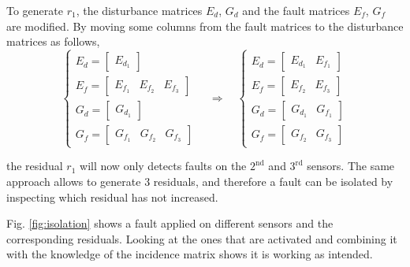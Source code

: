 \documentclass[conference]{IEEEtran}
\begin{document}
To generate $r_1$, the disturbance matrices $E_d$, $G_d$ and the fault matrices $E_f$, $G_f$ are modified. By moving some columns from the fault matrices to the disturbance matrices as follows,
\begin{equation}
    \begin{cases}
        E_d = \begin{bmatrix}
            E_{d_1}
        \end{bmatrix} \\
        E_f = \begin{bmatrix}
            E_{f_1} & E_{f_2} & E_{f_3}
        \end{bmatrix} \\
        G_d = \begin{bmatrix}
            G_{d_1}
        \end{bmatrix} \\
        G_f = \begin{bmatrix}
            G_{f_1} & G_{f_2} & G_{f_3}
        \end{bmatrix}
    \end{cases}
    \quad \Rightarrow \quad \begin{cases}
        E_d = \begin{bmatrix}
            E_{d_1} & E_{f_1}
        \end{bmatrix} \\
        E_f = \begin{bmatrix}
            E_{f_2} & E_{f_3}
        \end{bmatrix} \\
        G_d = \begin{bmatrix}
            G_{d_1} & G_{f_1}
        \end{bmatrix} \\
        G_f = \begin{bmatrix}
            G_{f_2} & G_{f_3}
        \end{bmatrix}
    \end{cases}
\end{equation}

the residual $r_1$ will now only detects faults on the $2^{\text{nd}}$ and $3^{\text{rd}}$ sensors. The same approach allows to generate 3 residuals, and therefore a fault can be isolated by inspecting which residual has not increased.

Fig. \ref{fig:isolation} shows a fault applied on different sensors and the corresponding residuals. Looking at the ones that are activated and combining it with the knowledge of the incidence matrix shows it is working as intended.
\end{document}
